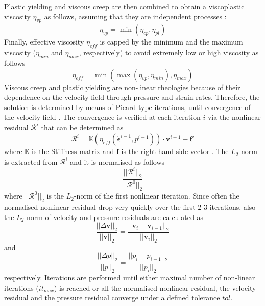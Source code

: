 \documentclass[hidelinks,10pt,a4paper]{article}
\begin{document}
Plastic yielding and viscous creep are then combined to obtain a viscoplastic viscosity $\eta_{vp}$ as follows, assuming that they are independent processes
\citep{Karato2008,Glerum2018}:
\begin{equation}\label{eq:viscoplastic}
\eta_{vp}=\min(\eta_{cp},\eta_{pl})
\end{equation}
Finally, effective viscosity $\eta_{eff}$ is capped by the minimum and the maximum viscosity ($\eta_{min}$ and $\eta_{max}$, respectively) to avoid extremely
low or high viscosity \citep{Glerum2018} as follows
\begin{equation}\label{eq:effective}
\eta_{eff}=\min(\max(\eta_{vp},\eta_{min}),\eta_{max})
\end{equation}
Viscous creep and plastic yielding are non-linear rheologies because of their dependence on the velocity field through pressure and strain rates. Therefore,
the solution is determined by means of Picard-type iterations, until convergence of the velocity field \citep{Glerum2018}. The convergence is verified at each
iteration $i$ via the nonlinear residual $\bm{\mathcal{R}}^i$ that can be determined as
\begin{equation}\label{eq:convergence}
\bm{\mathcal{R}}^i= \mathbb{K} (\eta_{eff}(\dot{\bm{\epsilon}}^{i-1},p^{i-1}))\cdot \bm{v}^{i-1} - \bm{f}^i
\end{equation}
where $\mathbb{K}$ is the Stiffness matrix and $\bm{f}$ is the right hand side vector \citep{Spiegelman2016,Glerum2018}.  The $L_2$-norm is extracted from
$\bm{\mathcal{R}}^i$ and it is normalised as follows
\begin{equation}\label{eq:convergence_res}
\frac{||\bm{\mathcal{R}}^i||_2}{||\bm{\mathcal{R}}^0||_2}
\end{equation}
where $||\bm{\mathcal{R}}^0||_2$ is the $L_2$-norm of the first nonlinear iteration.
Since often the normalised nonlinear residual drop very quickly over the first 2-3 iterations, also the $L_2$-norm of velocity and pressure residuals are
calculated as
\begin{equation}\label{eq:convergence_vel}
\frac{||\Delta\bm{v}||_2}{||\bm{v}||_2}=\frac{||\bm{v}_i-\bm{v}_{i-1}||_2}{||\bm{v}_{i}||_2}
\end{equation}
and
\begin{equation}\label{eq:convergence_press}
  \frac{||\Delta p||_2}{||p||_2}=\frac{||p_i-p_{i-1}||_2}{||p_{i}||_2}
\end{equation}
respectively. Iterations are performed until either maximal number of non-linear iterations ($it_{max}$) is reached or all the normalised nonlinear residual, 
the velocity residual and the pressure residual converge under a defined tolerance $tol$.
\end{document}
